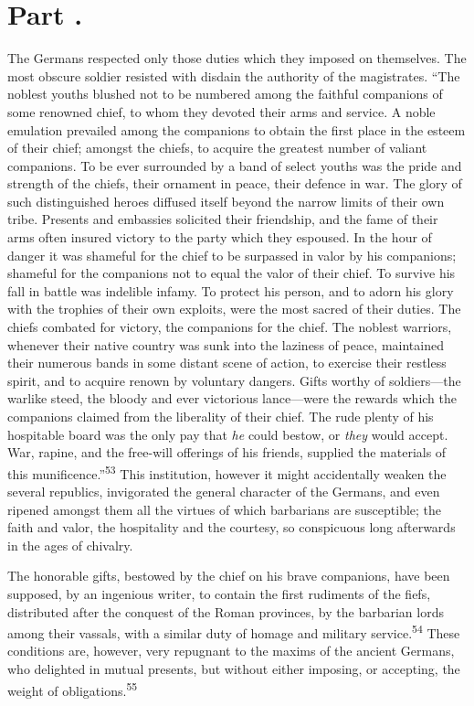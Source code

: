
\section{Part \thesection.}

The Germans respected only those duties which they imposed on
themselves. The most obscure soldier resisted with disdain the
authority of the magistrates. “The noblest youths blushed not to
be numbered among the faithful companions of some renowned chief,
to whom they devoted their arms and service. A noble emulation
prevailed among the companions to obtain the first place in the
esteem of their chief; amongst the chiefs, to acquire the
greatest number of valiant companions. To be ever surrounded by a
band of select youths was the pride and strength of the chiefs,
their ornament in peace, their defence in war. The glory of such
distinguished heroes diffused itself beyond the narrow limits of
their own tribe. Presents and embassies solicited their
friendship, and the fame of their arms often insured victory to
the party which they espoused. In the hour of danger it was
shameful for the chief to be surpassed in valor by his
companions; shameful for the companions not to equal the valor of
their chief. To survive his fall in battle was indelible infamy.
To protect his person, and to adorn his glory with the trophies
of their own exploits, were the most sacred of their duties. The
chiefs combated for victory, the companions for the chief. The
noblest warriors, whenever their native country was sunk into the
laziness of peace, maintained their numerous bands in some
distant scene of action, to exercise their restless spirit, and
to acquire renown by voluntary dangers. Gifts worthy of
soldiers—the warlike steed, the bloody and ever victorious
lance—were the rewards which the companions claimed from the
liberality of their chief. The rude plenty of his hospitable
board was the only pay that \textit{he} could bestow, or \textit{they} would
accept. War, rapine, and the free-will offerings of his friends,
supplied the materials of this munificence.”\textsuperscript{53} This institution,
however it might accidentally weaken the several republics,
invigorated the general character of the Germans, and even
ripened amongst them all the virtues of which barbarians are
susceptible; the faith and valor, the hospitality and the
courtesy, so conspicuous long afterwards in the ages of chivalry.

The honorable gifts, bestowed by the chief on his brave
companions, have been supposed, by an ingenious writer, to
contain the first rudiments of the fiefs, distributed after the
conquest of the Roman provinces, by the barbarian lords among
their vassals, with a similar duty of homage and military
service.\textsuperscript{54} These conditions are, however, very repugnant to the
maxims of the ancient Germans, who delighted in mutual presents,
but without either imposing, or accepting, the weight of
obligations.\textsuperscript{55}

